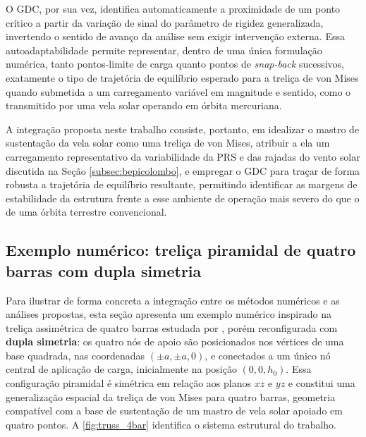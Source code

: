 O GDC, por sua vez, identifica automaticamente a proximidade de um ponto crítico a partir da variação de sinal do parâmetro de rigidez generalizada, invertendo o sentido de avanço da análise sem exigir intervenção externa. Essa autoadaptabilidade permite representar, dentro de uma única formulação numérica, tanto pontos-limite de carga quanto pontos de \textit{snap-back} sucessivos, exatamente o tipo de trajetória de equilíbrio esperado para a treliça de von Mises quando submetida a um carregamento variável em magnitude e sentido, como o transmitido por uma vela solar operando em órbita mercuriana.

A integração proposta neste trabalho consiste, portanto, em idealizar o mastro de sustentação da vela solar como uma treliça de von Mises, atribuir a ela um carregamento representativo da variabilidade da PRS e das rajadas do vento solar discutida na Seção \ref{subsec:bepicolombo}, e empregar o GDC para traçar de forma robusta a trajetória de equilíbrio resultante, permitindo identificar as margens de estabilidade da estrutura frente a esse ambiente de operação mais severo do que o de uma órbita terrestre convencional.

 
\subsection{Exemplo numérico: treliça piramidal de quatro barras com dupla simetria}
\label{subsec:exemplo-sed}
 
Para ilustrar de forma concreta a integração entre os métodos numéricos e as análises propostas, esta seção apresenta um exemplo numérico inspirado na treliça assimétrica de quatro barras estudada por \citealp{hrinda_nguyen2008}, porém reconfigurada com \textbf{dupla simetria}: os quatro nós de apoio são posicionados nos vértices de uma base quadrada, nas coordenadas $(\pm a, \pm a, 0)$, e conectados a um único nó central de aplicação de carga, inicialmente na posição $(0,0,h_0)$. Essa configuração piramidal é simétrica em relação aos planos $xz$ e $yz$ e constitui uma generalização espacial da treliça de von Mises para quatro barras, geometria compatível com a base de sustentação de um mastro de vela solar apoiado em quatro pontos. A \autoref{fig:truss_4bar} identifica o sistema estrutural do trabalho.

